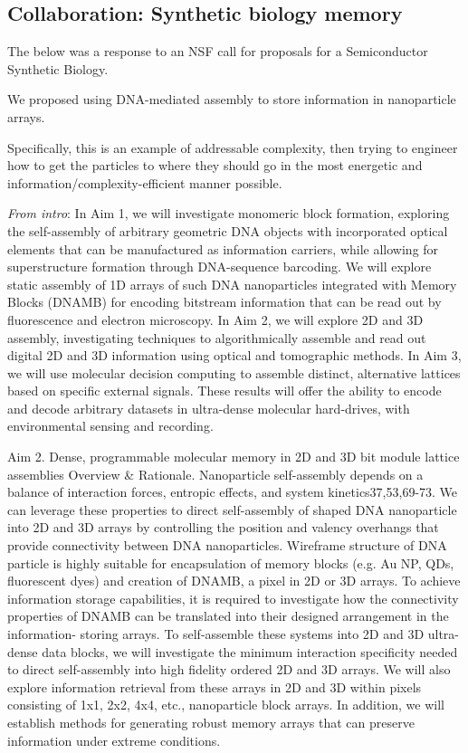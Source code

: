 \subsection{Collaboration: Synthetic biology memory}

The below was a response to an NSF call for proposals for a Semiconductor Synthetic Biology.

We proposed using DNA-mediated assembly to store information in nanoparticle arrays.

Specifically, this is an example of addressable complexity, then trying to engineer how to get the particles to where they should go in the most energetic and information/complexity-efficient manner possible.


\textit{From intro}:
In Aim 1, we will investigate monomeric block formation, exploring the self-assembly of arbitrary geometric DNA objects with incorporated optical elements that can be manufactured as information carriers, while allowing for superstructure formation through DNA-sequence barcoding. We will explore static assembly of 1D arrays of such DNA nanoparticles integrated with Memory Blocks (DNAMB) for encoding bitstream information that can be read out by fluorescence and electron microscopy. In Aim 2, we will explore 2D and 3D assembly, investigating techniques to algorithmically assemble and read out digital 2D and 3D information using optical and tomographic methods. In Aim 3, we will use molecular decision computing to assemble distinct, alternative lattices based on specific external signals. These results will offer the ability to encode and decode arbitrary datasets in ultra-dense molecular hard-drives, with environmental sensing and recording.

Aim 2. Dense, programmable molecular memory in 2D and 3D bit module lattice assemblies
Overview \& Rationale. Nanoparticle self-assembly depends on a balance of interaction forces, entropic effects, and system kinetics37,53,69-73. We can leverage these properties to direct self-assembly of shaped DNA nanoparticle into 2D and 3D arrays by controlling the position and valency overhangs that provide connectivity between DNA nanoparticles. Wireframe structure of DNA particle is highly suitable for encapsulation of memory blocks (e.g. Au NP, QDs, fluorescent dyes) and creation of DNAMB, a pixel in 2D or 3D arrays. To achieve information storage capabilities, it is required to investigate how the connectivity properties of DNAMB can be translated into their designed arrangement in the information- storing arrays. To self-assemble these systems into 2D and 3D ultra-dense data blocks, we will investigate the minimum interaction specificity needed to direct self-assembly into high fidelity ordered 2D and 3D arrays. We will also explore information retrieval from these arrays in 2D and 3D within pixels consisting of 1x1, 2x2, 4x4, etc., nanoparticle block arrays. In addition, we will establish methods for generating robust memory arrays that can preserve information under extreme conditions.

